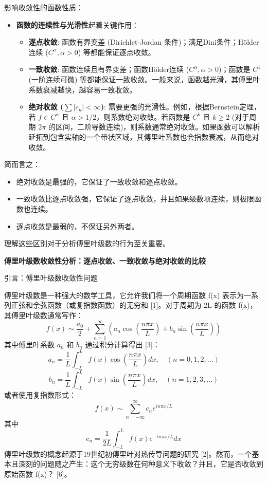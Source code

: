 影响收敛性的函数性质：

\begin{itemize}
	\item \textbf{函数的连续性与光滑性}起着关键作用：
	\begin{itemize}
		\item \textbf{逐点收敛}: 函数有界变差 (Dirichlet-Jordan 条件)；满足Dini条件；Hölder连续 ($C^\alpha, \alpha > 0$) 等都能保证逐点收敛。
		\item \textbf{一致收敛}: 函数连续且有界变差；函数Hölder连续 ($C^\alpha, \alpha > 0$)；函数是 $C^1$ (一阶连续可微) 等都能保证一致收敛。一般来说，函数越光滑，其傅里叶系数衰减越快，越容易一致收敛。
		\item \textbf{绝对收敛 ($\sum |c_n| < \infty$)}: 需要更强的光滑性。例如，根据Bernstein定理，若 $f \in C^\alpha$ 且 $\alpha > 1/2$，则系数绝对收敛。若函数是 $C^k$ 且 $k \ge 2$ (对于周期 $2\pi$ 的区间，二阶导数连续)，则系数通常绝对收敛。如果函数可以解析延拓到包含实轴的一个带状区域，其傅里叶系数也会指数衰减，从而绝对收敛。
	\end{itemize}
\end{itemize}

简而言之：

\begin{itemize}
	\item 绝对收敛是最强的，它保证了一致收敛和逐点收敛。
	\item 一致收敛比逐点收敛强，它保证了逐点收敛，并且如果级数项连续，则极限函数也连续。
	\item 逐点收敛是最弱的，不保证另外两者。
\end{itemize}

理解这些区别对于分析傅里叶级数的行为至关重要。

\textbf{傅里叶级数收敛性分析：逐点收敛、一致收敛与绝对收敛的比较}

引言：傅里叶级数收敛性问题

傅里叶级数是一种强大的数学工具，它允许我们将一个周期函数 f(x) 表示为一系列正弦和余弦函数（或复指数函数）的无穷和 [1]。对于周期为 2L 的函数 f(x)，其傅里叶级数通常写作：
\[
f(x) \sim \frac{a_0}{2} + \sum_{n=1}^{\infty} \left( a_n \cos\left(\frac{n\pi x}{L}\right) + b_n \sin\left(\frac{n\pi x}{L}\right) \right)
\]
其中傅里叶系数 $a_n$ 和 $b_n$ 通过积分计算得出 [3]：
\[
a_n = \frac{1}{L} \int_{-L}^{L} f(x) \cos\left(\frac{n\pi x}{L}\right) dx, \quad (n=0, 1, 2, \dots)
\]
\[
b_n=\frac{1}{L}\int_{-L}^{L}f(x)\sin\left(\frac{n\pi x}{L}\right)dx,\quad(n=1,2,3,\dots)
\]
或者使用复指数形式：
\[
f(x)\sim\sum_{n=-\infty}^{\infty}c_ne^{in\pi x/L}
\]
其中
\[
c_n=\frac{1}{2L}\int_{-L}^{L}f(x)e^{-in\pi x/L}dx
\]
傅里叶级数的概念起源于19世纪初傅里叶对热传导问题的研究 [2]。然而，一个基本且深刻的问题随之产生：这个无穷级数在何种意义下收敛？并且，它是否收敛到原始函数 f(x)？ [6]。

